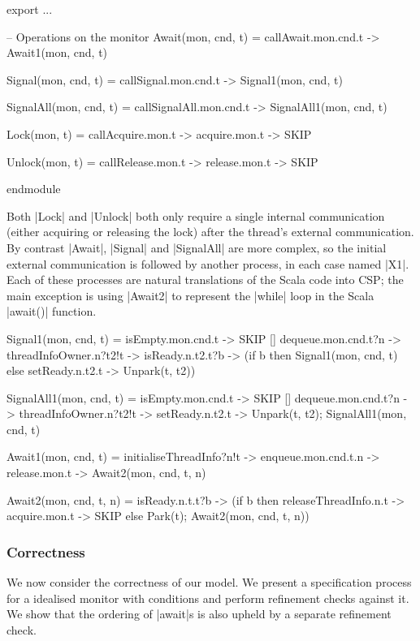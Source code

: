 \begin{cspm}
export 
  ...

  -- Operations on the monitor
  Await(mon, cnd, t) = callAwait.mon.cnd.t -> Await1(mon, cnd, t)

  Signal(mon, cnd, t) = callSignal.mon.cnd.t -> Signal1(mon, cnd, t)

  SignalAll(mon, cnd, t) = callSignalAll.mon.cnd.t -> SignalAll1(mon, cnd, t)

  Lock(mon, t) = callAcquire.mon.t -> acquire.mon.t -> SKIP

  Unlock(mon, t) = callRelease.mon.t -> release.mon.t -> SKIP

 endmodule
\end{cspm}

Both |Lock| and |Unlock| both only require a single internal communication (either acquiring or releasing the lock) after the thread's external communication. By contrast |Await|, |Signal| and |SignalAll| are more complex, so the initial external communication is followed by another process, in each case named |X1|. Each of these processes are natural translations of the Scala code into CSP; the main exception is using |Await2| to represent the |while| loop in the Scala |await()| function.

\begin{cspm}
Signal1(mon, cnd, t) = 
      isEmpty.mon.cnd.t -> SKIP
  [] dequeue.mon.cnd.t?n -> threadInfoOwner.n?t2!t -> isReady.n.t2.t?b ->
        (if b then Signal1(mon, cnd, t)
        else setReady.n.t2.t -> Unpark(t, t2))

SignalAll1(mon, cnd, t) =
      isEmpty.mon.cnd.t -> SKIP
  [] dequeue.mon.cnd.t?n -> threadInfoOwner.n?t2!t -> setReady.n.t2.t -> 
          Unpark(t, t2); SignalAll1(mon, cnd, t)

Await1(mon, cnd, t) = 
  initialiseThreadInfo?n!t -> enqueue.mon.cnd.t.n -> release.mon.t -> Await2(mon, cnd, t, n)

Await2(mon, cnd, t, n) = 
  isReady.n.t.t?b -> (if b then releaseThreadInfo.n.t -> acquire.mon.t -> SKIP
                      else Park(t); Await2(mon, cnd, t, n))
\end{cspm}



\subsubsection{Correctness}\label{section:SCLMonitor-Correctness}

We now consider the correctness of our model. We present a specification process for a idealised monitor with conditions and perform refinement checks against it. We show that the ordering of |await|s is also upheld by a separate refinement check.
  
